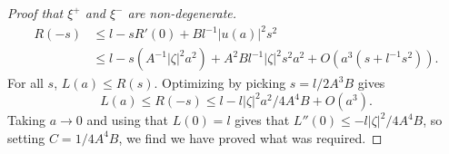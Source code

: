 \begin{proof}[Proof that $\xi^+$ and $\xi^-$ are non-degenerate]
    \begin{equation}
    \begin{split}
        R(-s) &\leq l - s R'(0) + B l^{-1} |u(a)|^2 s^2\\
        &\leq l - s ( A^{-1} |\zeta|^2 a^2 ) + A^2 B l^{-1} |\zeta|^2 s^2 a^2 + O(a^3 ( s + l^{-1} s^2)).
    \end{split}
    \end{equation}
    For all $s$, $L(a) \leq R(s)$. Optimizing by picking $s = l / 2 A^3 B$ gives
    \begin{equation}
        L(a) \leq R(-s) \leq l - l |\zeta|^2 a^2 / 4 A^4 B + O( a^3 ).
    \end{equation}
    Taking $a \to 0$ and using that $L(0) = l$ gives that $L''(0) \leq - l |\zeta|^2 / 4 A^4 B$, so setting $C = 1/4 A^4 B$, we find we have proved what was required. \qedhere
    \begin{comment}


    \[ R(s) \leq l + a^2 s + B a^2 l^{-1} |\zeta|^2 s^2 + o( a^2 ) [l^{-1} s^2 + |s|]. \]
    Optimizing by picking $s = - l |\zeta| / 2 B$ gives
    \[ R(s) \leq l - \frac{la^2}{4 B |\zeta|^2} \]




    Picking $a^2 s + B a l^{-1} |\zeta|^2 \leq - l a^2$



    \[ A^2 |u(a)| |(\partial_j T)(s)| \]

    $A^2 |u(a)| |(\partial_j T)(s)| \leq A^2 |u(a)| [ A |u(a)|^2  ]$

    $A |u(a)|$




    Since $\bar{T}(0) = v_0$, if we let $b(a) = \sum g_{ij}(x_0,v_0) n^i(a) v_0^j$ then
    \[ B(0) = \sum g_{ij}(x_0, v_0) u^i(a) v_0^j = \sum g_{ij}(x_0,v_0) ( v_0^i - c(a) n^i(a) ) v_0^j = 1 - c(a) b(a). \]
    We have
    \[ B'(s) = g_s( u(a), 
      ) \]


\end{comment}
\end{proof}
